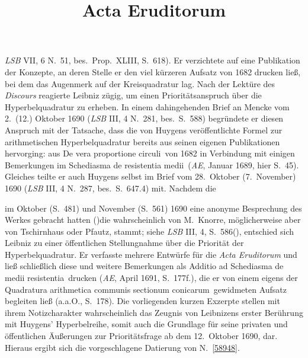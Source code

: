\begin{ledgroup}
\textit{LSB} VII, 6 N.~51, bes.\ Prop.~XLIII, S.~618).
%
Er verzichtete auf eine Publikation der Konzepte, an deren Stelle er den viel kürzeren 
%
\cite{02042}Aufsatz von 1682 drucken ließ, bei dem das Augenmerk auf der Kreisquadratur lag.
%
Nach der Lektüre des \textit{Discours} reagierte Leibniz zügig, um einen Prioritätsanspruch über die Hyperbelquadratur zu erheben. 
%
In einem dahingehenden \cite{02045}Brief an 
%
\protect{}Mencke
%
vom 2.\ (12.) Oktober 1690
%
(\cite{02045}\textit{LSB} III, 4 N.~281, bes.\ S.~588)
%
begründete er diesen Anspruch mit der Tatsache, dass die von 
%
\protect{}Huygens 
%
veröffentlichte Formel zur arithmetischen Hyperbelquadratur
%
bereits aus seinen eigenen Publikationen hervorging: aus \cite{02042}\glqq De vera proportione circuli\grqq\ von 1682 in Verbindung mit
%
einigen Bemerkungen im \cite{01024}\glqq Schediasma de resistentia medii\grqq\ (\cite{01023}\textit{AE}, Januar 1689, hier S.~45).
%
Gleiches teilte er auch \protect{}Huygens selbst
%
im \cite{01507}Brief vom 28.\ Oktober (7.\ November) 1690 (\textit{LSB} III, 4 N.~287, bes.\ S.~647.4) mit.
%
Nachdem die \cite{01023}\title{Acta Eruditorum} im Oktober (S.~481) und November (S.~561) 1690
%
eine anonyme Besprechung
%
des Werkes gebracht hatten (\protect\vphantom)die wahrscheinlich von \protect{}M.~Knorre,
%
möglicherweise aber von 
%
\protect{}Tschirnhaus oder 
%
\protect{}Pfautz,
%
stammt; siehe \textit{LSB} III, 4, S.~586\protect\vphantom(),
%
entschied sich Leibniz zu einer öffentlichen Stellungnahme über die Priorität der Hyperbelquadratur.
%
Er verfasste mehrere Entwürfe für die \cite{01023}\textit{Acta Eruditorum}
%
und ließ schließlich diese und weitere Bemerkungen als 
%
\cite{02043}\glqq Additio ad Schediasma de medii resistentia\grqq\ drucken (\cite{01023}\textit{AE}, April 1691, S.~177f.), 
%
die er von einem eigens der \cite{02044}\glqq Quadratura arithmetica communis sectionum conicarum\grqq\ gewidmeten Aufsatz
%
begleiten ließ (\cite{01023}a.a.O., S.~178).
%
\pend
\newpage
%
\pstart
Die vorliegenden kurzen Exzerpte stellen mit ihrem Notizcharakter wahrscheinlich das Zeugnis von
%
Leibnizens erster Berührung mit 
%
\protect{}Huygens' 
%
Hyperbelreihe, somit auch die Grundlage für seine privaten und öffentlichen Äußerungen zur Prioritätsfrage 
%
ab dem 12.\ Oktober 1690, dar. 
%
Hieraus ergibt sich die vorgeschlagene Datierung von N.~\ref{58948}.
\pend 
\end{ledgroup}
